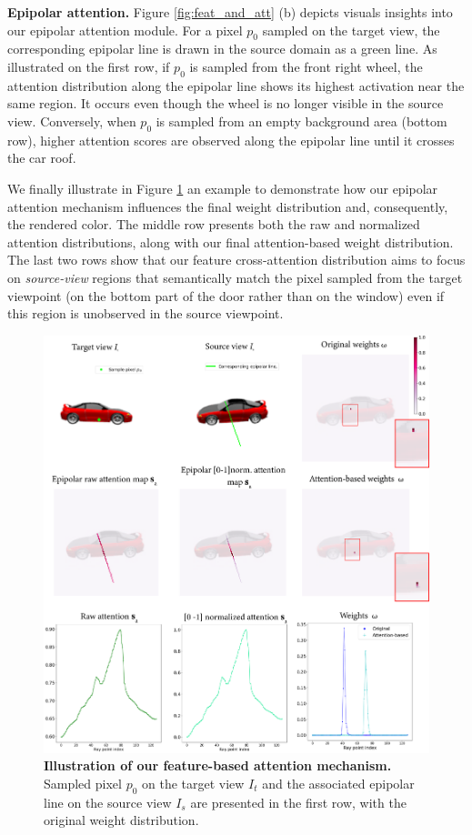 \noindent \textbf{Epipolar attention.}
Figure \ref{fig:feat_and_att} (b) depicts visuals insights into our epipolar attention module. For a pixel $p_{0}$ sampled on the target view, the corresponding epipolar line is drawn in the source domain as a green line. As illustrated on the first row, if $p_{0}$ is sampled from the front right wheel, the attention distribution along the epipolar line shows its highest activation near the same region. It occurs even though the wheel is no longer visible in the source view. Conversely, when $p_{0}$ is sampled from an empty background area (bottom row), higher attention scores are observed along the epipolar line until it crosses the car roof. 

We finally illustrate in Figure \ref{fig:attention_overview} an example to demonstrate how our epipolar attention mechanism influences the final weight distribution and, consequently, the rendered color. The middle row presents both the raw and normalized attention distributions, along with our final attention-based weight distribution.   The last two rows show that our feature cross-attention distribution aims to focus on \textit{source-view} regions that semantically match the pixel sampled from the target viewpoint (\eg on the bottom part of the door rather than on the window) even if this region is unobserved in the source viewpoint. 

\begin{figure}[htp!]
    \begin{center}
  \includegraphics[width=\linewidth]{images/epinerf/SUPP_COMPLETE_OVERVIEW_OVERLEAF.png}
  \caption{\textbf{Illustration of our feature-based attention mechanism.} Sampled pixel $p_{0}$ on the target view $I_{t}$ and the associated epipolar line on the source view $I_{s}$ are presented in the first row, with the original weight distribution. }
  \label{fig:attention_overview}
  \end{center}
\end{figure}

